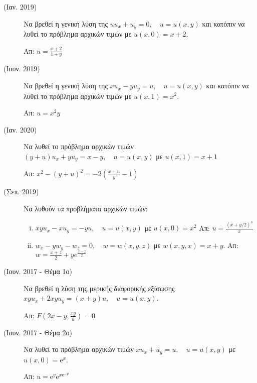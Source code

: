 



\thispagestyle{askhseis}



\begin{center}
  \minibox{\large\bfseries \textcolor{Col1}{ΜΔΕ 1ης τάξης (Θέματα)}}
\end{center}

\vspace{\baselineskip}

\begin{description}
  \item [(Ιαν. 2019)] Να βρεθεί η γενική λύση της $ uu_{x}+u_{y}=0, \quad u=u(x,y) $ 
    και κατόπιν να λυθεί το πρόβλημα αρχικών τιμών με $ u(x,0)=x+2 $.

    \hfill Απ: $ u= \frac{x+2}{1+y} $ 

  \item [(Ιουν. 2019)] Να βρεθεί η γενική λύση της $ xu_{x}-yu_{y}=u, \quad u=u(x,y) $ 
    και κατόπιν να λυθεί το πρόβλημα αρχικών τιμών με $ u(x,1)=x^{2} $.

    \hfill Απ: $ u=x^{2}y $ 

  \item [(Ιαν. 2020)] Να λυθεί το πρόβλημα αρχικών τιμών $ (y+u)u_{x}+yu_{y}=x-y, 
    \quad u=u(x,y) $ με $ u(x,1)=x+1 $

    \hfill Απ: $ x^{2}-(y+u)^{2} = -2 (\frac{x+u}{y} -1) $ 

  \item [(Σεπ. 2019)] Να λυθούν τα προβλήματα αρχικών τιμών:
    \begin{enumerate}[i)]
      \item $ xyu_{x}-xu_{y}=-yu, \quad u=u(x,y) $ με $ u(x,0)=x^{2} $ 
        \hfill Απ: $ u= \frac{(x+y/2)^{3}}{x} $
      \item $ w_{x}-yw_{y}-w_{z}=0, \quad w=w(x,y,z) $ με $ w(x,y,x)=x+y $.
        \hfill Απ: $ w= \frac{x+z}{2} + ye^{\frac{x-z}{2}} $ 
    \end{enumerate}

  \item [(Ιουν. 2017 - Θέμα 1ο)] Να βρεθεί η λύση της μερικής διαφορικής εξίσωσης 
    $ xyu_{x}+2xyu_{y}=(x+y)u, \quad u=u(x,y) $.

    \hfill Απ: $ F(2x-y, \frac{xy}{u}) = 0 $ 

  \item [(Ιουν. 2017 - Θέμα 2ο)] Να λυθεί το πρόβλημα αρχικών τιμών 
    $x u_{x} + u_{y}=u, \quad u=u(x,y) $ με $ u(x,0)= \mathrm{e}^{x} $.

    \hfill Απ: $ u= \mathrm{e}^{y} \mathrm{e}^{x\mathrm{e}^{-y}} $  
\end{description}


